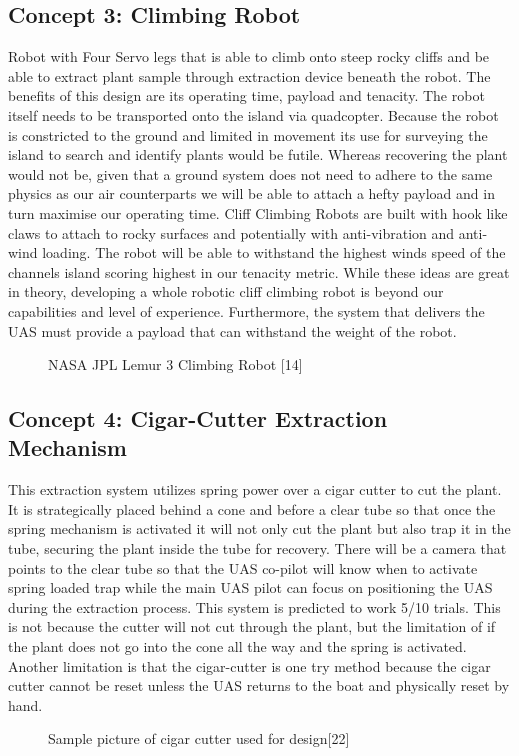 \documentclass{wrcecapstone}
\begin{document}
\subsection{Concept 3:  Climbing Robot}
Robot with Four Servo legs that is able to climb onto steep rocky cliffs and be able to extract plant sample through extraction device beneath the robot. The benefits of this design are its operating time, payload and tenacity. The robot itself needs to be transported onto the island via quadcopter. Because the robot is constricted to the ground and limited in movement its use for surveying the island to search and identify plants would be futile. Whereas recovering the plant would not be, given that a ground system does not need to adhere to the same physics as our air counterparts we will be able to attach a hefty payload and in turn maximise our operating time.  Cliff Climbing Robots are built with hook like claws to attach to rocky surfaces and potentially with anti-vibration and anti-wind loading. The robot will be able to withstand the highest winds speed of the channels island scoring highest in our tenacity metric. While  these ideas are great in theory, developing a whole robotic cliff climbing robot is beyond our capabilities  and level of experience. Furthermore, the system that delivers the UAS must provide a payload that can withstand the weight of the robot. 
\begin{figure}
\caption{NASA JPL Lemur 3 Climbing Robot [14]}
\end{figure}



\subsection{Concept 4: Cigar-Cutter Extraction Mechanism}
This extraction system utilizes spring power over a cigar cutter to cut the plant. It is strategically placed behind a cone and before a clear tube so that once the spring mechanism is activated it will not only cut the plant but also trap it in the tube, securing the plant inside the tube for recovery. There will be a camera that points to the clear tube so that the UAS co-pilot will know when to activate spring loaded trap while the main UAS pilot can focus on positioning the UAS during the extraction process. This system is predicted to work 5/10 trials. This is not because the cutter will not cut through  the plant, but the limitation of if the plant does not go into the cone all the way and the spring is activated. Another limitation is that the cigar-cutter is one try method because the cigar cutter cannot be reset unless the UAS returns to the boat and physically reset by hand. 
\begin{figure}
\caption{Sample picture of cigar cutter used for design[22]}
\end{figure}
\end{document}
